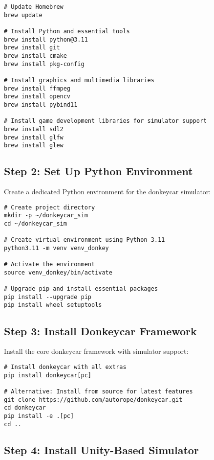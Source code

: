 \documentclass[11pt,a4paper]{article}
\begin{document}
\begin{lstlisting}[style=bashstyle, caption={Install Essential Dependencies}]
# Update Homebrew
brew update

# Install Python and essential tools
brew install python@3.11
brew install git
brew install cmake
brew install pkg-config

# Install graphics and multimedia libraries
brew install ffmpeg
brew install opencv
brew install pybind11

# Install game development libraries for simulator support
brew install sdl2
brew install glfw
brew install glew
\end{lstlisting}

\subsection{Step 2: Set Up Python Environment}

Create a dedicated Python environment for the donkeycar simulator:

\begin{lstlisting}[style=bashstyle, caption={Create Virtual Environment}]
# Create project directory
mkdir -p ~/donkeycar_sim
cd ~/donkeycar_sim

# Create virtual environment using Python 3.11
python3.11 -m venv venv_donkey

# Activate the environment
source venv_donkey/bin/activate

# Upgrade pip and install essential packages
pip install --upgrade pip
pip install wheel setuptools
\end{lstlisting}

\subsection{Step 3: Install Donkeycar Framework}

Install the core donkeycar framework with simulator support:

\begin{lstlisting}[style=bashstyle, caption={Install Donkeycar}]
# Install donkeycar with all extras
pip install donkeycar[pc]

# Alternative: Install from source for latest features
git clone https://github.com/autorope/donkeycar.git
cd donkeycar
pip install -e .[pc]
cd ..
\end{lstlisting}

\subsection{Step 4: Install Unity-Based Simulator}
\end{document}
